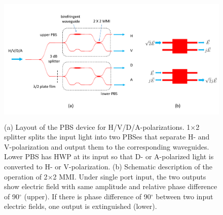 \documentclass[letterpaper, 10pt]{article}
\begin{document}
\begin{figure}
  \centering
  \includegraphics[height=6.3cm]{./layout}
  \caption{(a) Layout of the PBS device for H/V/D/A-polarizations. 1$\times$2 splitter splits the input light into two PBSes that separate H- and V-polarization and output them to the corresponding waveguides. Lower PBS has HWP at its input so that D- or A-polarized light is converted to H- or V-polarization. (b) Schematic description of the operation of 2$\times$2 MMI. Under single port input, the two outputs show electric field with same amplitude and relative phase difference of 90$^\circ$ (upper). If there is phase difference of 90$^\circ$ between two input electric fields, one output is extinguished (lower).}
  \label{fig:layout}
\end{figure}

\end{document}
